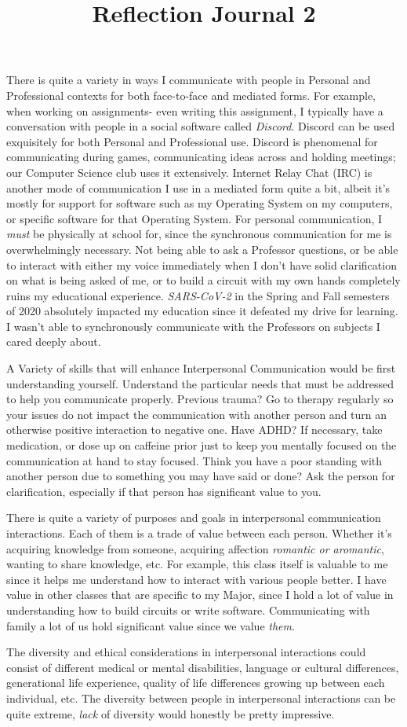 \documentclass[12pt]{article}
\begin{document}
\title{Reflection Journal 2}
\par
There is quite a variety in ways I communicate with people in Personal and Professional contexts for both face-to-face and mediated forms. For example, when working on assignments- even writing this assignment, I typically have a conversation with people in a social software called \emph{Discord}. Discord can be used exquisitely for both Personal and Professional use. Discord is phenomenal for communicating during games, communicating ideas across and holding meetings; our Computer Science club uses it extensively. Internet Relay Chat (IRC) is another mode of communication I use in a mediated form quite a bit, albeit it's mostly for support for software such as my Operating System on my computers, or specific software for that Operating System. For personal communication, I \emph{must} be physically at school for, since the synchronous communication for me is overwhelmingly necessary. Not being able to ask a Professor questions, or be able to interact with either my voice immediately when I don't have solid clarification on what is being asked of me, or to build a circuit with my own hands completely ruins my educational experience. \emph{SARS-CoV-2} in the Spring and Fall semesters of 2020 absolutely impacted my education since it defeated my drive for learning. I wasn't able to synchronously communicate with the Professors on subjects I cared deeply about.
\par
A Variety of skills that will enhance Interpersonal Communication would be first understanding yourself. Understand the particular needs that must be addressed to help you communicate properly. Previous trauma? Go to therapy regularly so your issues do not impact the communication with another person and turn an otherwise positive interaction to negative one. Have ADHD? If necessary, take medication, or dose up on caffeine prior just to keep you mentally focused on the communication at hand to stay focused. Think you have a poor standing with another person due to something you may have said or done? Ask the person for clarification, especially if that person has significant value to you.
\par
There is quite a variety of purposes and goals in interpersonal communication interactions. Each of them is a trade of value between each person. Whether it's acquiring knowledge from someone, acquiring affection \emph{romantic or aromantic}, wanting to share knowledge, etc. For example, this class itself is valuable to me since it helps me understand how to interact with various people better. I have value in other classes that are specific to my Major, since I hold a lot of value in understanding how to build circuits or write software. Communicating with family a lot of us hold significant value since we value \emph{them}. 
\par
The diversity and ethical considerations in interpersonal interactions could consist of different medical or mental disabilities, language or cultural differences, generational life experience, quality of life differences growing up between each individual, etc. The diversity between people in interpersonal interactions can be quite extreme, \emph{lack} of diversity would honestly be pretty impressive. 
\end{document}
